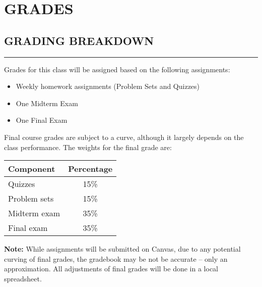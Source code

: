 \section*{GRADES}

\subsection*{GRADING BREAKDOWN}
\vspace*{-0.5cm}
\rule{\textwidth}{2pt}

Grades for this class will be assigned based on the following assignments:
\begin{itemize}
    \item Weekly homework assignments (Problem Sets and Quizzes)
    \item One Midterm Exam
    \item One Final Exam
\end{itemize}
Final course grades are subject to a curve, although it largely depends on the class performance. 
The weights for the final grade are:

\begin{center}
\begin{tabular}{lc}
\toprule
\textbf{Component} & \textbf{Percentage} \\
\midrule
Quizzes       & 15\% \\
Problem sets  & 15\% \\
Midterm exam  & 35\% \\
Final exam    & 35\% \\
\bottomrule
\end{tabular}
\end{center}

\textbf{Note:} 
While assignments will be submitted on Canvas, due to any potential curving of final grades, the gradebook may be not be accurate -- only an approximation. 
All adjustments of final grades will be done in a local spreadsheet. 
